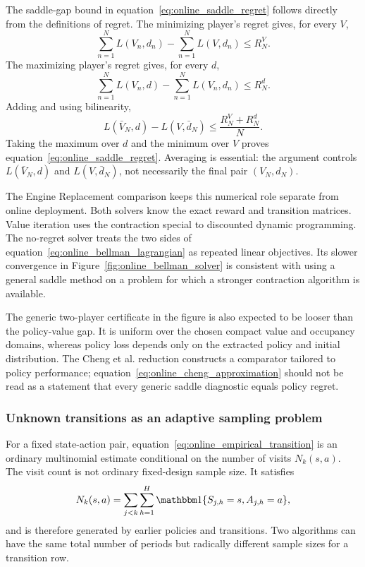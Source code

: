 The saddle-gap bound in equation~\eqref{eq:online_saddle_regret} follows directly from the definitions of regret. The minimizing player's regret gives, for every $V$,
\begin{equation}
\sum_{n=1}^N L(V_n,d_n)
-
\sum_{n=1}^N L(V,d_n)
\leq R_N^V.
\label{eq:online_value_player_regret}
\end{equation}
The maximizing player's regret gives, for every $d$,
\begin{equation}
\sum_{n=1}^N L(V_n,d)
-
\sum_{n=1}^N L(V_n,d_n)
\leq R_N^d.
\label{eq:online_occupancy_player_regret}
\end{equation}
Adding and using bilinearity,
\[
L(\bar V_N,d)-L(V,\bar d_N)
\leq\frac{R_N^V+R_N^d}{N}.
\]
Taking the maximum over $d$ and the minimum over $V$ proves equation~\eqref{eq:online_saddle_regret}. Averaging is essential: the argument controls $L(\bar V_N,d)$ and $L(V,\bar d_N)$, not necessarily the final pair $(V_N,d_N)$.

The Engine Replacement comparison keeps this numerical role separate from online deployment. Both solvers know the exact reward and transition matrices. Value iteration uses the contraction special to discounted dynamic programming. The no-regret solver treats the two sides of equation~\eqref{eq:online_bellman_lagrangian} as repeated linear objectives. Its slower convergence in Figure~\ref{fig:online_bellman_solver} is consistent with using a general saddle method on a problem for which a stronger contraction algorithm is available.

The generic two-player certificate in the figure is also expected to be looser than the policy-value gap. It is uniform over the chosen compact value and occupancy domains, whereas policy loss depends only on the extracted policy and initial distribution. The Cheng et al. reduction constructs a comparator tailored to policy performance; equation~\eqref{eq:online_cheng_approximation} should not be read as a statement that every generic saddle diagnostic equals policy regret.

\subsubsection{Unknown transitions as an adaptive sampling problem}

For a fixed state-action pair, equation~\eqref{eq:online_empirical_transition} is an ordinary multinomial estimate conditional on the number of visits $N_k(s,a)$. The visit count is not ordinary fixed-design sample size. It satisfies
\[
N_k(s,a)=\sum_{j<k}\sum_{h=1}^H\indicator{S_{j,h}=s,A_{j,h}=a},
\]
and is therefore generated by earlier policies and transitions. Two algorithms can have the same total number of periods but radically different sample sizes for a transition row.

